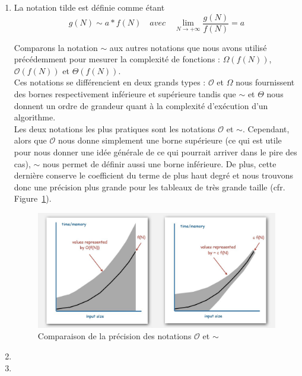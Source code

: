 \begin{enumerate}
	\item La notation tilde est définie comme étant\cite{tilde-pdf}
        $$g(N) \sim a * f(N) \quad avec \quad \lim\limits_{N
        \longrightarrow +\infty} \frac{g(N)}{f(N)} = a$$

	Comparons la notation $\sim$ aux autres notations que
        nous avons utilisé précédemment pour mesurer la complexité
        de fonctions :
	$\Omega(f(N))$, $\mathcal{O}(f(N))$ et $\Theta(f(N))$. \\
	Ces notations se différencient en deux grands types :
        $\mathcal{O}$ et $\Omega$ nous fournissent des bornes
        respectivement inférieure et supérieure tandis que $\sim$
        et $\Theta$ nous donnent un ordre de grandeur quant à la
        complexité d'exécution d'un algorithme.\\
	Les deux notations les plus pratiques sont les notations
        $\mathcal{O}$ et $\sim$. Cependant, alors que $\mathcal{O}$
        nous donne simplement une borne supérieure (ce qui est utile
        pour nous donner une idée générale de ce qui pourrait arriver
        dans le pire des cas), $\sim$ nous permet de définir aussi une
        borne inférieure. De plus, cette dernière conserve le coefficient
        du terme de plus haut degré et nous trouvons donc une précision
        plus grande pour les tableaux de très grande taille
        (cfr. Figure~\ref{complex_tilde}).

        \begin{figure}[h]
	        \includegraphics[width=\textwidth]{complex_tilde.jpg}
	        \caption{Comparaison de la précision des notations
                $\mathcal{O}$ et $\sim$ \cite{image-complex}}
	        \label{complex_tilde}
        \end{figure}	

	\item
	\item
\end{enumerate}





